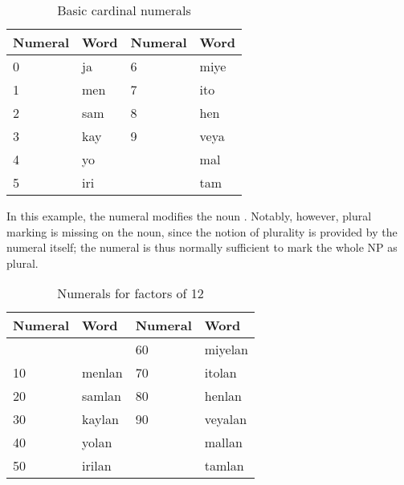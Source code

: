 \begin{table}[p]\centering
\caption{Basic cardinal numerals}
\begin{tabu} to .75\linewidth {X I X I}
\toprule\tableheaderfont
Numeral
	& Word
	& Numeral
	& Word
	\\
\toprule

0
	& ja %
	& 6
	& miye %
	\\

1
	& men %
	& 7
	& ito %
	\\
	
2
	& sam %
	& 8
	& hen %
	\\
	
3
	& kay %
	& 9
	& veya %
	\\

4
	& yo %
	& \ten
	& mal %
	\\

5
	& iri %
	& \elv
	& tam %
	\\

\bottomrule
\end{tabu}
\label{tab:cardinals}
\end{table}

In this example, the numeral  modifies the noun 
. Notably, however, plural marking is missing on the 
noun, since the notion of plurality is provided by the numeral itself; the 
numeral is thus normally sufficient to mark the whole NP as plural.

\begin{table}[p]\centering
\caption{Numerals for factors of 12}
\begin{tabu} to .75\linewidth {X I X I}
\toprule\tableheaderfont
Numeral
	& Word
	& Numeral
	& Word
	\\
\toprule

%
	& %
	& 60
	& miyelan %
	\\

10 
	& menlan %
	& 70
	& itolan %
	\\

20 
	& samlan %
	& 80
	& henlan %
	\\

30 
	& kaylan %
	& 90
	& veyalan %
	\\

40 
	& yolan %
	& 
	& mallan %
	\\

50 
	& irilan %
	& 
	& tamlan %
	\\

\bottomrule
\end{tabu}
\label{tab:cardinalsten}
\end{table}

